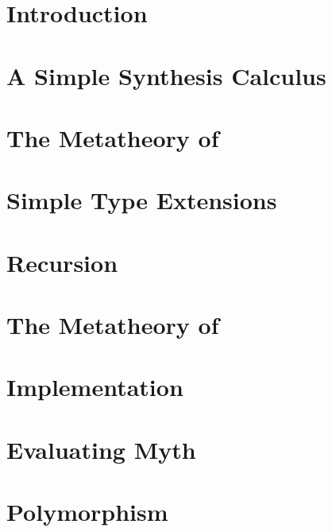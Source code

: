 \chapter{Introduction}
\setcounter{page}{1}
\hypersetup{pageanchor=true}
\singlespaced
\label{ch:introduction}


\chapter{A Simple Synthesis Calculus}
\label{ch:a-simple-synthesis-calculus}


\chapter{The Metatheory of \texorpdfstring{\lsyn{}}{λsyn}}
\label{ch:metatheory-of-lsyn}


\chapter{Simple Type Extensions}
\label{ch:simple-type-extensions}


\chapter{Recursion}
\label{ch:recursion}


\chapter{The Metatheory of \texorpdfstring{\mlsyn{}}{MLsyn}}
\label{ch:metatheory-of-mlsyn}


\chapter{Implementation}
\label{ch:implementation}


\chapter{Evaluating Myth}
\label{ch:evaluating-myth}


\chapter{Polymorphism}
\label{ch:polymorphism}


